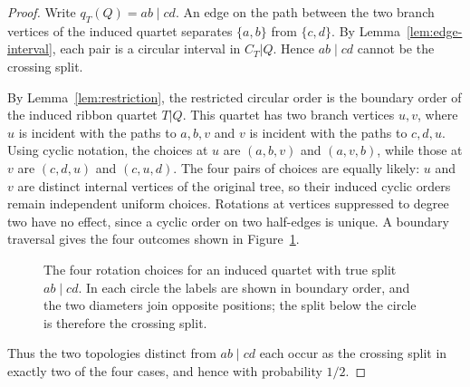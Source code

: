 \documentclass[a4paper]{amsart}
\theoremstyle{remark}
\begin{document}
\begin{proof}
Write $q_T(Q)=ab\mid cd$. An edge on the path between the two branch
vertices of the induced quartet separates $\{a,b\}$ from
$\{c,d\}$. By Lemma~\ref{lem:edge-interval}, each pair is a circular
interval in $C_T|Q$. Hence $ab\mid cd$ cannot be the crossing split.

By Lemma~\ref{lem:restriction}, the restricted circular order is the
boundary order of the induced ribbon quartet $T|Q$. This quartet has
two branch vertices $u,v$, where $u$ is incident with the paths to
$a,b,v$ and $v$ is incident with the paths to $c,d,u$. Using cyclic
notation, the choices at $u$ are $(a,b,v)$ and $(a,v,b)$, while those
at $v$ are $(c,d,u)$ and $(c,u,d)$. The four pairs of choices are
equally likely: $u$ and $v$ are distinct internal vertices of the
original tree, so their induced cyclic orders remain independent
uniform choices. Rotations at vertices suppressed to degree two have
no effect, since a cyclic order on two half-edges is unique. A boundary
traversal gives the four outcomes shown in
Figure~\ref{fig:quartet-rotations}.

\begin{figure}[t]
\centering
{}
\caption{The four rotation choices for an induced quartet with true
split $ab\mid cd$. In each circle the labels are shown in boundary
order, and the two diameters join opposite positions; the split below
the circle is therefore the crossing split.}
\label{fig:quartet-rotations}
\end{figure}

Thus the two topologies distinct from $ab\mid cd$ each occur as the
crossing split in exactly two of the four cases, and hence with
probability $1/2$.
\end{proof}
\end{document}
